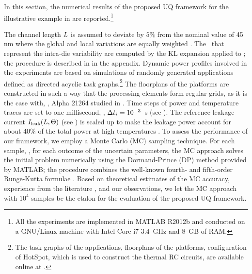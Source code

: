 In this section, the numerical results of the proposed UQ framework for the illustrative example in  are reported.\footnote{All the experiments are implemented in MATLAB R2012b \cite{matlab} and conducted on a GNU/Linux machine with Intel Core i7 3.4~GHz and 8~GB of RAM.}

The channel length $L$ is assumed to deviate by $5\%$ from the nominal value of 45 nm where the global and local variations are equally weighted \cite{juan2011, juan2012}. The \rvs\ that represent the intra-die variability are computed by the KL expansion applied to ; the procedure is described in  in the appendix. Dynamic power profiles involved in the experiments are based on simulations of randomly generated applications defined as directed acyclic task graphs.\footnote{The task graphs of the applications, floorplans of the platforms, configuration of HotSpot, which is used to construct the thermal RC circuits, are available online at \cite{sources}.} The floorplans of the platforms are constructed in such a way that the processing elements form regular grids, as it is the case with, \eg, Alpha 21264 studied in \cite{juan2011}. Time steps of power and temperature traces are set to one millisecond, \ie, $\Delta t_i = 10^{-3}$~s (see ). The reference leakage current $I_{\text{leak}}(L, \Theta)$ (see ) is scaled up to make the leakage power account for about $40\%$ of the total power at high temperatures \cite{liu2007}. To assess the performance of our framework, we employ a Monte Carlo (MC) sampling technique. For each sample, \ie, for each outcome of the uncertain parameters, the MC approach solves the initial problem numerically using the Dormand-Prince (DP) method provided by MATLAB; the procedure combines the well-known fourth- and fifth-order Runge-Kutta formulae \cite{press2007}. Based on theoretical estimates \cite{diaz-emparanza2002} of the MC accuracy, experience from the literature \cite{xiu2010, eldred2009, maitre2010, shen2009}, and our observations, we let the MC approach with $10^4$ samples be the etalon for the evaluation of the proposed UQ framework.

